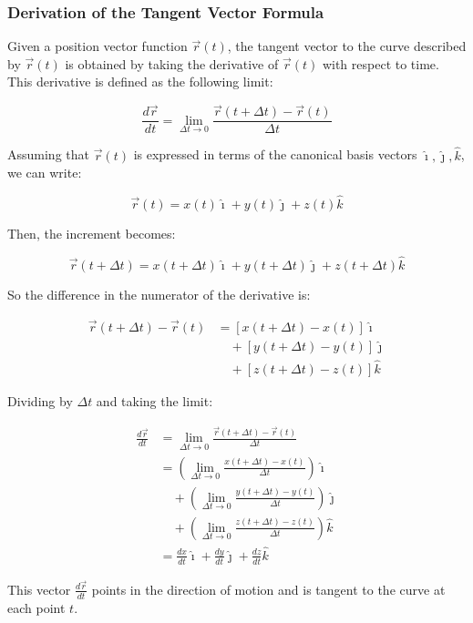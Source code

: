 \subsubsection{Derivation of the Tangent Vector Formula}

Given a position vector function \(\vec{r}(t)\), the tangent vector to the curve described by 
\(\vec{r}(t)\) is obtained by taking the derivative of \(\vec{r}(t)\) with respect to time. This 
derivative is defined as the following limit:

\[
    \frac{d\vec{r}}{dt} = \lim_{\Delta t \to 0} \frac{\vec{r}(t + \Delta t) - \vec{r}(t)}{\Delta t}
\]

Assuming that \(\vec{r}(t)\) is expressed in terms of the canonical basis vectors \(\hat{\imath}, 
\hat{\jmath}, \hat{k}\), we can write:

\[
    \vec{r}(t) = x(t)\hat{\imath} + y(t)\hat{\jmath} + z(t)\hat{k}
\]

Then, the increment becomes:

\[
    \vec{r}(t + \Delta t) = x(t + \Delta t)\hat{\imath} + y(t + \Delta t)\hat{\jmath} + z(t + \Delta t)
    \hat{k}
\]

So the difference in the numerator of the derivative is:

\begin{align*}
    \vec{r}(t + \Delta t) - \vec{r}(t) &= \left[x(t + \Delta t) - x(t)\right]\hat{\imath} \\
    &\quad + \left[y(t + \Delta t) - y(t)\right]\hat{\jmath} \\
    &\quad + \left[z(t + \Delta t) - z(t)\right]\hat{k}
\end{align*}

Dividing by \(\Delta t\) and taking the limit:

\begin{align*}
    \frac{d\vec{r}}{dt} &= \lim_{\Delta t \to 0} \frac{\vec{r}(t + \Delta t) - \vec{r}(t)}{\Delta t} \\
    &= \left( \lim_{\Delta t \to 0} \frac{x(t + \Delta t) - x(t)}{\Delta t} \right) \hat{\imath} \\
    &\quad + \left( \lim_{\Delta t \to 0} \frac{y(t + \Delta t) - y(t)}{\Delta t} \right) \hat{\jmath} \\
    &\quad + \left( \lim_{\Delta t \to 0} \frac{z(t + \Delta t) - z(t)}{\Delta t} \right) \hat{k} \\
    &= \frac{dx}{dt} \hat{\imath} + \frac{dy}{dt} \hat{\jmath} + \frac{dz}{dt} \hat{k}
\end{align*}

This vector \(\frac{d\vec{r}}{dt}\) points in the direction of motion and is tangent to the curve at 
each point \(t\).

